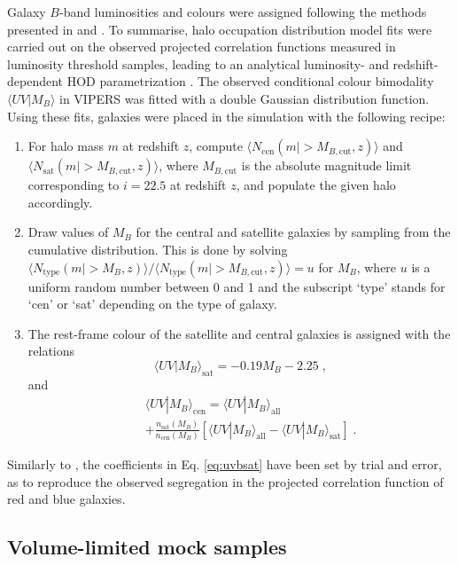 \documentclass[longauth]{aa}
\begin{document}
Galaxy $B$-band luminosities and colours were assigned following the methods presented in \citet{skibba06} and \citet{skibba09}.  To summarise, halo occupation distribution model fits were carried out on the observed projected correlation functions measured in luminosity threshold samples, leading to an analytical luminosity- and redshift-dependent HOD parametrization \citep{delatorre13a}. The observed conditional colour bimodality $\langle UV | M_B\rangle$ in VIPERS was fitted with a double Gaussian distribution function. Using these fits, galaxies were placed in the simulation with the following recipe:
\begin{enumerate}
	\item For halo mass $m$ at redshift $z$, compute $\langle N_{\mathrm{cen}}(m | >M_{B,\mathrm{cut}}, z)\rangle$ and $\langle N_{\mathrm{sat}}(m | >M_{B,\mathrm{cut}},z)\rangle$, where $M_{B,\mathrm{cut}}$ is the absolute magnitude limit corresponding to $i=22.5$ at redshift $z$, and populate the given halo accordingly.
    \item Draw values of $M_{B}$ for the central and satellite galaxies by sampling from the cumulative distribution.  This is done by solving $\langle  N_{\mathrm{type}}(m | >M_{B},z)\rangle/\langle N_{\mathrm{type}}(m | >M_{B,\mathrm{cut}},z)\rangle=u$ for $M_{B}$, where $u$ is a uniform random number between 0 and 1 and the subscript `type' stands for `cen' or `sat' depending on the type of galaxy.    
    \item The rest-frame colour of the satellite and central galaxies is assigned with the relations \citep{skibba09} 
    \begin{equation} \label{eq:uvbsat}
    	\langle UV | M_B\rangle_{\mathrm{sat}} =  -0.19 M_B -2.25\; , 
    \end{equation}
and
	\begin{eqnarray}\nonumber
		&&\langle UV | M_B\rangle_{\mathrm{cen}} =  \langle UV | M_B\rangle_{\mathrm{all}}  \\ 
		&&+ \frac{n_{\mathrm{sat}}(M_B)}{n_{\mathrm{cen}}(M_B)}\left[\langle UV|M_B\rangle_{\mathrm{all}} - \langle UV | M_B\rangle_{\mathrm{sat}} \right]\; .
\end{eqnarray}
\end{enumerate}
Similarly to \citet{skibba09}, the coefficients in Eq. \ref{eq:uvbsat} have been set by trial and error, as to reproduce the observed segregation in the projected correlation function of red and blue galaxies.

\subsection{Volume-limited mock samples}		\label{sec:vol-lim_mocks}
\end{document}
